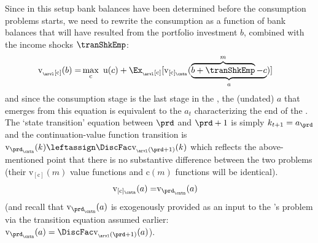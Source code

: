 \documentclass[titlepage, headings=optiontotocandhead]{econtex}
\begin{document}
Since in this setup bank balances have been determined before the consumption problems starts, we need to rewrite the consumption {\stg}  as a function of bank balances that will have resulted from the portfolio investment $b$, combined with the income shocks $\tranShkEmp$:
\begin{equation}\begin{gathered}\begin{aligned}
      \mathrm{v}_{_\arvl[\mathrm{c}]}(b) = & \max_{\mathrm{c}}~ \mathrm{u}(c) + \Ex_{_\arvl[\mathrm{c}]}[\mathrm{v}_{[\mathrm{c}]_\cntn}(\underbrace{\overbrace{b+\tranShkEmp}^{m}-c}_{a})]
    \end{aligned}\end{gathered}\end{equation}
and since the consumption stage is the last stage in the {\interval}, the (undated) $a$ that emerges from this equation is equivalent to the $a_{t}$ characterizing the end of the {\interval}.  The `state transition' equation between $\prd$ and $\prd+1$ is simply $k_{t+1} = a_{\prd}$ and the continuation-value function transition is $\mathrm{v}_{\prd_\cntn}(k) \leftassign \DiscFac \mathrm{v}_{_\arvl(\prd+1)}(k)$ which reflects the above-mentioned point that there is no substantive difference between the two problems (their $\mathrm{v}_{[\mathrm{c}]}(m)$ value functions and $\mathrm{c}(m)$ functions will be identical).
\begin{equation}\begin{gathered}\begin{aligned}
      \mathrm{v}_{[\mathrm{c}]_\cntn}(a) = & \mathrm{v}_{\prd_\cntn}(a)
    \end{aligned}\end{gathered}\end{equation}
(and recall that $\mathrm{v}_{\prd_\cntn}(a)$ is exogenously provided as an input to the {\interval}'s problem via the transition equation assumed earlier: $\mathrm{v}_{\prd_\cntn}(a)=\DiscFac \mathrm{v}_{_\arvl(\prd+1)}(a)$).
\end{document}
